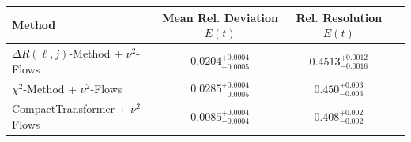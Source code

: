     \begin{tabular}{lccc}
        \toprule
        Method & Mean Rel. Deviation $E(t)$ & Rel. Resolution $E(t)$ \\
        \midrule
        $\Delta R(\ell,j)$-Method + $\nu^2$-Flows & $0.0204^{+0.0004}_{-0.0005}$ & $0.4513^{+0.0012}_{-0.0016}$ \\
        $\chi^2$-Method + $\nu^2$-Flows & $0.0285^{+0.0004}_{-0.0005}$ & $0.450^{+0.003}_{-0.003}$ \\
        CompactTransformer + $\nu^2$-Flows & $0.0085^{+0.0004}_{-0.0004}$ & $0.408^{+0.002}_{-0.002}$ \\
        \bottomrule
    \end{tabular}